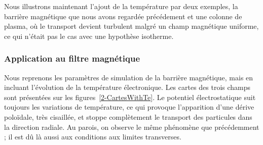 \begin{refsection}
Nous illustrons maintenant l'ajout de la température par deux exemples, la
barrière magnétique que nous avons regardée précédement et une colonne de
plasma, où le transport devient turbulent malgré un champ magnétique uniforme, ce qui
n'était pas le cas avec une hypothèse isotherme.

	\subsubsection{Application au filtre magnétique}

Nous reprenons les paramètres de simulation de la barrière magnétique, mais en
incluant l'évolution de la température électronique. Les cartes des trois champs
sont présentées sur les figures~\ref{2-CartesWithTe}. Le
potentiel électrostatique suit toujours les variations de température, ce qui
provoque l'apparition d'une dérive poloïdale, très cisaillée, et stoppe complètement le
transport des particules dans la direction radiale. Au parois, on observe le
même phénomène que précédemment ; il est dû là aussi aux conditions aux limites
transverses.
	\begin{figure}[!htbp]
    \centering

\end{figure}
\end{refsection}
